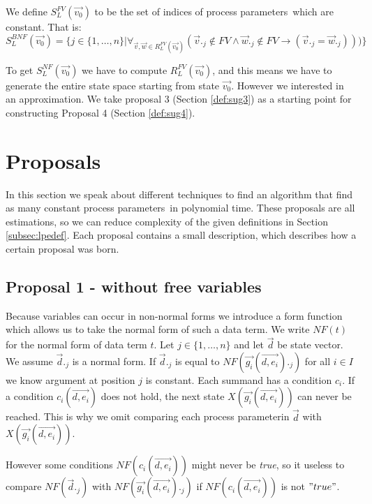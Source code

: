 \index{}\documentclass[a4paper,10pt]{article}
\theoremstyle{plain}
\theoremstyle{definition}
\newcommand{\ovr}{\overrightarrow}
\newcommand{\pp}{process parameter}
\newcommand{\pps}{process parameters}
\newcommand{\ti}{\textit}
\begin{document}
\begin{defn}\label{def:lpe_comp_fv} We define $S_L^{FV}(\ovr{v_0})$ to be the set of indices of \pps\ which are constant. That is:\\

$S_L^{BNF}(\ovr{v_0}) = \lbrace j \in  \lbrace 1, \ldots, n \rbrace \vert \forall_{\ovr{v}, \ovr{w} \in R_L^{FV}(\ovr{v_0})}( \ovr{v}._j \not\in FV \wedge \ovr{w}._j \not\in FV \rightarrow ( \ovr{v}._j = \ovr{w}._j)))
\rbrace $
\end{defn}

To get $S_L^{NF} (\ovr{v_0})$ we have to compute $R_L^{FV}(\ovr{v_0})$, and this means we have to generate the entire state space starting from state $\ovr{v_0}$. However we interested in an approximation. We take proposal 3 (Section \ref{def:sug3}) as a starting point for constructing Proposal 4 (Section \ref{def:sug4}).

\section{Proposals}
In this section we speak about different techniques to find an algorithm that find as many constant \pps\ in polynomial time. These proposals are all estimations, so we can reduce complexity of the given definitions in Section \ref{subsec:lpedef}. Each proposal contains a small description, which describes how a certain proposal was born. 

\subsection{Proposal 1 - without free variables} \label{sec:prop1}
Because variables can occur in non-normal forms we introduce a form function which allows us to take the normal form of such a data term. 
We write $NF(t)$ for the normal form of data term $t$. 
Let $j \in \lbrace 1, \ldots,  n \rbrace $ and let $\ovr{d}$ be state vector. We assume $\ovr{d}._j$ is a normal form. If $\ovr{d}._j$ is equal to $NF(\ovr{g_i}(\ovr{d,e_i})._j)$ for all $i \in I$ we know argument at position $j$ is constant. Each summand has a condition $c_i$. If a condition $c_i(\ovr{d, e_i})$ does not hold, the next state $X(\ovr{g_i}(\ovr{d, e_i}))$ can never be reached. This is why we omit comparing each \pp in $\ovr{d} $ with $X(\ovr{g_i}(\ovr{d, e_i}))$.

 However some conditions $NF(c_i(\ovr{d,e_i}))$ might never be \ti{true}, so it useless to compare $NF(\ovr{d}._j)$ with $NF(\ovr{g_i}(\ovr{d,e_i})._j)$  if $NF(c_i(\ovr{d,e_i}))$ is not  $"true"$. \\
\end{document}
